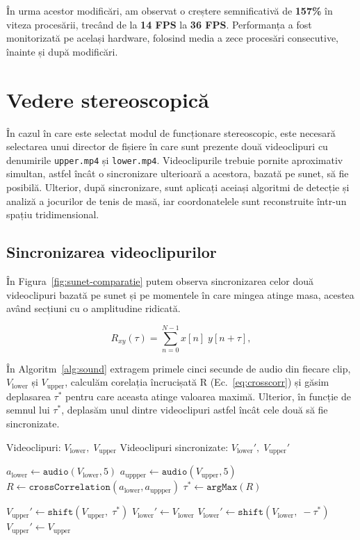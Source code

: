 În urma acestor modificări, am observat o creștere semnificativă de \textbf{157\%} în viteza procesării, trecând de la \textbf{14 FPS} la \textbf{36 FPS}. Performanța a fost monitorizată pe același hardware, folosind media a zece procesări consecutive, înainte și după modificări.


\section{Vedere stereoscopică}
În cazul în care este selectat modul de funcționare stereoscopic, este necesară selectarea unui director de fișiere în care sunt prezente două videoclipuri cu denumirile \texttt{upper.mp4} și \texttt{lower.mp4}. Videoclipurile trebuie pornite aproximativ simultan, astfel încât o sincronizare ulterioară a acestora, bazată pe sunet, să fie posibilă. Ulterior, după sincronizare, sunt aplicați aceiași algoritmi de detecție și analiză a jocurilor de tenis de masă, iar coordonatelele sunt reconstruite într-un spațiu tridimensional.

\subsection{Sincronizarea videoclipurilor}
În Figura~\ref{fig:sunet-comparatie} putem observa sincronizarea celor două videoclipuri bazată pe sunet și pe momentele în care mingea atinge masa, acestea având secțiuni cu o amplitudine ridicată.

\begin{equation}
R_{xy}(\tau)=\sum_{n=0}^{N-1} x[n]\;y[n+\tau],
\label{eq:crosscorr}
\end{equation}

În Algoritm~\ref{alg:sound} extragem primele cinci secunde de audio din fiecare clip, $V_{\mathrm{lower}}$ și $V_{\mathrm{upper}}$, calculăm corelația încrucișată R (Ec.~\eqref{eq:crosscorr}) și găsim deplasarea \(\tau^\ast\) pentru care aceasta atinge valoarea maximă. Ulterior, în funcție de semnul lui \(\tau^\ast\), deplasăm unul dintre videoclipuri astfel încât cele două să fie sincronizate.

\begin{algorithm}[H]
\caption{Sincronizarea a două videoclipuri pe baza audio.} 
\label{alg:sound}
\begin{algorithmic}[1]
\Require Videoclipuri: $V_{\text{lower}},\; V_{\text{upper}}$
\Ensure  Videoclipuri sincronizate: $V_{\text{lower}}',\; V_{\text{upper}}'$

\State $a_{\text{lower}} \gets \texttt{audio}(V_{\text{lower}}, 5)$
\State $a_{\text{uppper}}  \gets \texttt{audio}(V_{\text{upper}}, 5)$
\State $R \gets \texttt{crossCorrelation}(a_{\text{lower}}, a_{\text{uppper}})$
\State $\tau^\ast \gets \texttt{argMax}(R)$           

    \State $V_{\text{upper}}' \gets \texttt{shift}(V_{\text{upper}},\;\tau^\ast)$
    \State $V_{\text{lower}}' \gets V_{\text{lower}}$
\Else
    \State $V_{\text{lower}}' \gets \texttt{shift}(V_{\text{lower}},\;-\tau^\ast)$
    \State $V_{\text{upper}}' \gets V_{\text{upper}}$
\EndIf
\end{algorithmic}
\end{algorithm}



